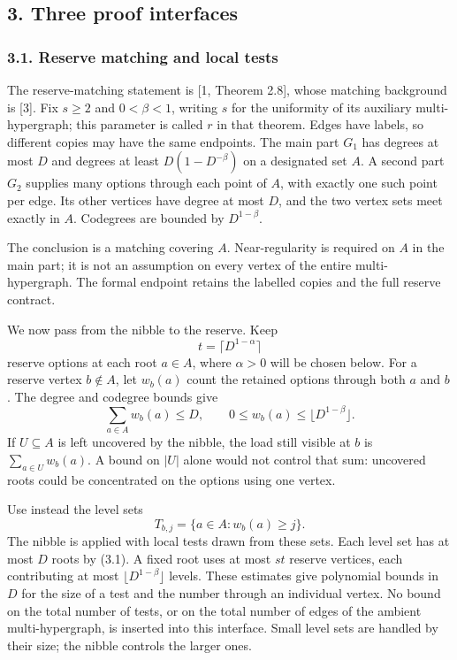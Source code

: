 \documentclass[english,11pt,a4paper]{article}
\begin{document}
\subsection{3. Three proof interfaces}\label{three-proof-interfaces}


\subsubsection{3.1. Reserve matching and local tests}\label{reserve-matching-and-local-tests}

The reserve-matching statement is {[}1, Theorem 2.8{]}, whose matching background is {[}3{]}. Fix \(s\ge2\) and \(0<\beta<1\), writing \(s\) for the uniformity of its auxiliary multi-hypergraph; this parameter is called \(r\) in that theorem. Edges have labels, so different copies may have the same endpoints. The main part \(G_1\) has degrees at most \(D\) and degrees at least \(D(1-D^{-\beta})\) on a designated set \(A\). A second part \(G_2\) supplies many options through each point of \(A\), with exactly one such point per edge. Its other vertices have degree at most \(D\), and the two vertex sets meet exactly in \(A\). Codegrees are bounded by \(D^{1-\beta}\).

The conclusion is a matching covering \(A\). Near-regularity is required on \(A\) in the main part; it is not an assumption on every vertex of the entire multi-hypergraph. The formal endpoint retains the labelled copies and the full reserve contract.

We now pass from the nibble to the reserve. Keep \[t=\lceil D^{1-\alpha}\rceil\] reserve options at each root \(a\in A\), where \(\alpha>0\) will be chosen below. For a reserve vertex \(b\notin A\), let \(w_b(a)\) count the retained options through both \(a\) and \(b\). The degree and codegree bounds give \[\sum_{a\in A}w_b(a)\le D,
\qquad
0\le w_b(a)\le\lfloor D^{1-\beta}\rfloor.
\tag{3.1}\] If \(U\subseteq A\) is left uncovered by the nibble, the load still visible at \(b\) is \(\sum_{a\in U}w_b(a)\). A bound on \(|U|\) alone would not control that sum: uncovered roots could be concentrated on the options using one vertex.

Use instead the level sets \[T_{b,j}=\{a\in A:w_b(a)\ge j\}.\] The nibble is applied with local tests drawn from these sets. Each level set has at most \(D\) roots by (3.1). A fixed root uses at most \(s t\) reserve vertices, each contributing at most \(\lfloor D^{1-\beta}\rfloor\) levels. These estimates give polynomial bounds in \(D\) for the size of a test and the number through an individual vertex. No bound on the total number of tests, or on the total number of edges of the ambient multi-hypergraph, is inserted into this interface. Small level sets are handled by their size; the nibble controls the larger ones.
\end{document}

